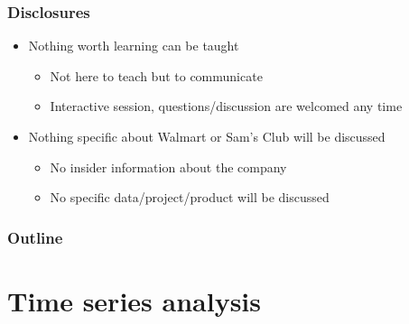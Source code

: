 \documentclass[aspectratio=169,xcolor=x11names,table]{beamer}
\begin{document}
\begin{frame}
	\frametitle{Disclosures}
	\begin{itemize}
		\item Nothing worth learning can be taught
			\begin{itemize}
				\item Not here to teach but to communicate
				\item Interactive session, questions/discussion are welcomed any time
			\end{itemize}
			\vspace{1cm}
		\item Nothing specific about Walmart or Sam's Club will be discussed
			\begin{itemize}
				\item No insider information about the company
				\item No specific data/project/product will be discussed
			\end{itemize}
	\end{itemize}
\end{frame}

\begin{frame}
	\frametitle{Outline}
	\tableofcontents[hideallsubsections]
\end{frame}

\section{Time series analysis}
\end{document}
